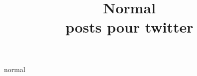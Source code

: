 \documentclass{article}
\title {\large {\textbf {Normal}} \\ \small {posts pour twitter}}
\begin{document}
\maketitle
 normal
 
 
\end{document}
